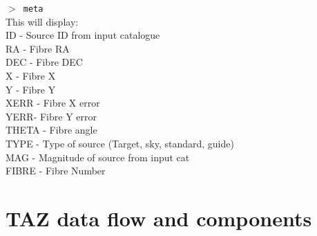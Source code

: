 \documentclass[12pt]{article}
\begin{document}
\hspace{10mm}  \texttt{$>$ meta}\\

This will display:\\

ID - Source ID from input catalogue    \\
RA - Fibre RA \\
DEC - Fibre DEC \\
X - Fibre X \\
Y - Fibre Y \\
XERR - Fibre X error \\
YERR- Fibre Y error\\
THETA - Fibre angle \\
TYPE - Type of source (Target, sky, standard, guide)\\
MAG - Magnitude of source from input cat\\
FIBRE - Fibre Number\\
 
 
 
 
 \section{TAZ data flow and components}
  
\end{document}
